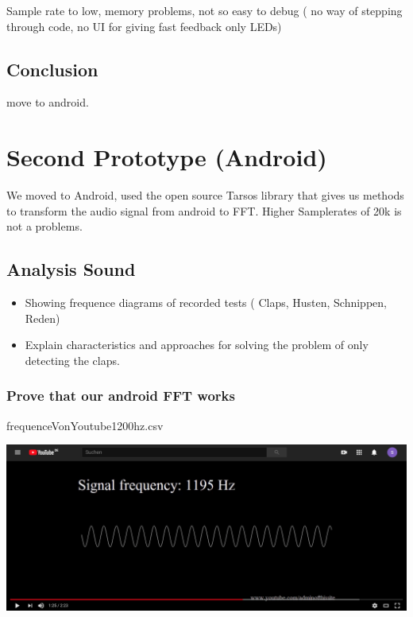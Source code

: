 \documentclass
[
 12pt, %
       DIV12,
       a4paper,
       oneside,
       titlepage,
       parskip=half,
       headings=normal,
       listof=totoc,
       bibliography=totoc,
       index=totoc,
       captions=tableheading,
       ]{scrreprt}
\begin{document}
Sample rate to low, memory problems, not so easy to debug ( no way of stepping
through code, no UI for giving fast feedback only LEDs)
\section{Conclusion}
\label{sec:org7d640f8}
move to android.



\chapter{Second Prototype (Android)}
\label{sec:org320397e}
We moved to Android, used the open source Tarsos library that gives us methods to transform
the audio signal from android to FFT.
Higher Samplerates of 20k is not a problems.

\section{Analysis Sound}
\label{sec:org511a6a2}
\begin{itemize}
\item Showing frequence diagrams of recorded tests ( Claps, Husten, Schnippen, Reden)
\item Explain characteristics and approaches for solving the problem of only
detecting the claps.
\end{itemize}

\subsection{Prove that our android FFT works}
\label{sec:org505b32f}
frequenceVonYoutube1200hz.csv

\begin{center}
\includegraphics[width=.9\linewidth]{./imgs/ytpicture.png}
\end{center}
\end{document}
